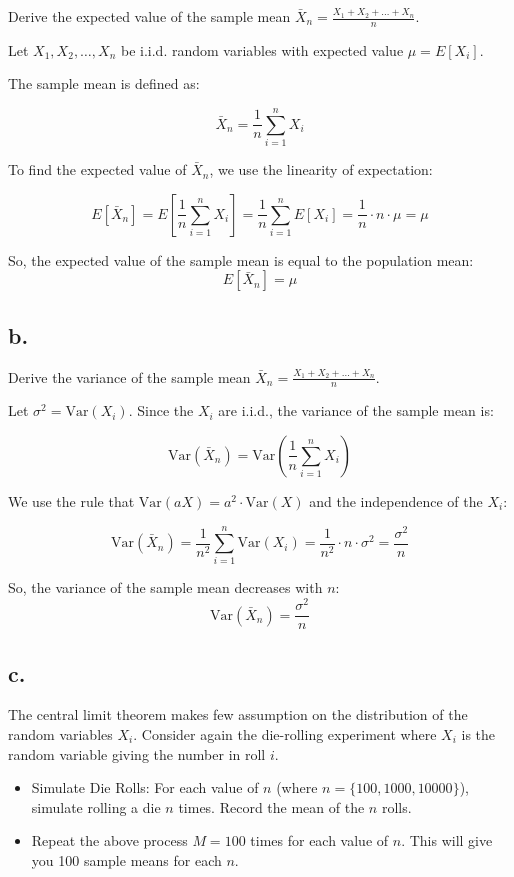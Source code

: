 \documentclass[
]{article}
\begin{document}
Derive the expected value of the sample mean
\(\bar X_n=\frac{X_1+X_2+\ldots+X_n}{n}\).

Let \(X_1, X_2, \ldots, X_n\) be i.i.d. random variables with expected
value \(\mu = E[X_i]\).

The sample mean is defined as:

\[
\bar{X}_n = \frac{1}{n} \sum_{i=1}^n X_i
\]

To find the expected value of \(\bar{X}_n\), we use the linearity of
expectation:

\[
E[\bar{X}_n] = E\left[ \frac{1}{n} \sum_{i=1}^n X_i \right]
= \frac{1}{n} \sum_{i=1}^n E[X_i]
= \frac{1}{n} \cdot n \cdot \mu = \mu
\]

So, the expected value of the sample mean is equal to the population
mean: \[
E[\bar{X}_n] = \mu
\]

\subsection{b.}\label{b.-3}

Derive the variance of the sample mean
\(\bar X_n=\frac{X_1+X_2+\ldots+X_n}{n}\).

Let \(\sigma^2 = \text{Var}(X_i)\). Since the \(X_i\) are i.i.d., the
variance of the sample mean is:

\[
\text{Var}(\bar{X}_n) = \text{Var}\left( \frac{1}{n} \sum_{i=1}^n X_i \right)
\]

We use the rule that \(\text{Var}(aX) = a^2 \cdot \text{Var}(X)\) and
the independence of the \(X_i\):

\[
\text{Var}(\bar{X}_n) = \frac{1}{n^2} \sum_{i=1}^n \text{Var}(X_i)
= \frac{1}{n^2} \cdot n \cdot \sigma^2 = \frac{\sigma^2}{n}
\]

So, the variance of the sample mean decreases with \(n\): \[
\text{Var}(\bar{X}_n) = \frac{\sigma^2}{n}
\]

\subsection{c.~}\label{c.-3}

The central limit theorem makes few assumption on the distribution of
the random variables \(X_i\). Consider again the die-rolling experiment
where \(X_i\) is the random variable giving the number in roll \(i\).

\begin{itemize}
\item
  Simulate Die Rolls: For each value of \(n\) (where
  \(n=\{100,1000,10000\}\)), simulate rolling a die \(n\) times. Record
  the mean of the \(n\) rolls.
\item
  Repeat the above process \(M=100\) times for each value of \(n\). This
  will give you 100 sample means for each \(n\).
\end{itemize}
\end{document}
